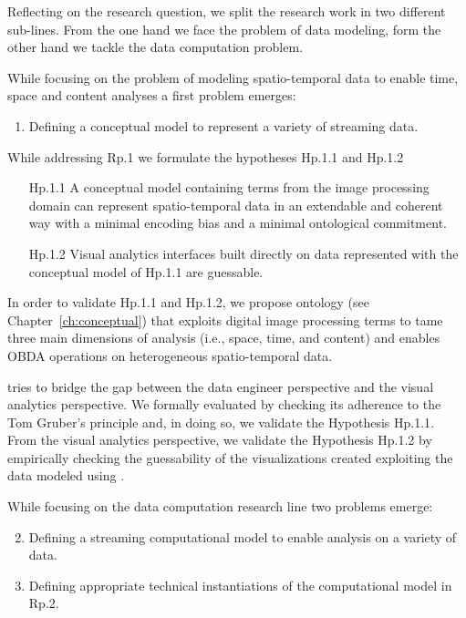 Reflecting on the research question, we split the research work in two different sub-lines.
From the one hand we face the problem of data modeling, form the other hand we tackle the data computation problem.

While focusing on the problem of modeling spatio-temporal data to enable time, space and content analyses a first problem emerges:

\begin{enumerate}[leftmargin=32pt,label=\textsf{Rp.\arabic*}]
\item Defining a conceptual model to represent a variety of streaming data.
\end{enumerate}

While addressing \textsf{Rp.1} we formulate the hypotheses \textsf{Hp.1.1} and \textsf{Hp.1.2}
\begin{itemize}[leftmargin=42pt]
\item[\textsf{Hp.1.1}] A conceptual model containing terms from the image processing domain can represent spatio-temporal data in an extendable and coherent way with a minimal encoding bias and a minimal ontological commitment.
\item[\textsf{Hp.1.2}] Visual analytics interfaces built directly on data represented with the conceptual model of Hp.1.1 are guessable.
\end{itemize}

In order to validate \textsf{Hp.1.1} and \textsf{Hp.1.2}, we propose \frappe{} ontology (see Chapter~\ref{ch:conceptual}) that exploits digital image processing terms to tame three main dimensions of analysis (i.e., space, time, and content) and enables OBDA operations on heterogeneous spatio-temporal data.

\frappe{} tries to bridge the gap between the data engineer perspective and the visual analytics perspective.
We formally evaluated \frappe{} by checking its adherence to the Tom Gruber's principle and, in doing so, we validate the Hypothesis \textsf{Hp.1.1}.
From the visual analytics perspective, we validate the Hypothesis \textsf{Hp.1.2} by empirically checking the guessability of the visualizations created exploiting the data modeled using \frappe{}.

While focusing on the data computation research line two problems emerge:
\begin{enumerate}[leftmargin=32pt,label=\textsf{Rp.\arabic*}]
\setcounter{enumi}{1}
\item Defining a streaming computational model to enable analysis on a variety of data.
\item Defining appropriate technical instantiations of the computational model in \textsf{Rp.2}.
\end{enumerate}


